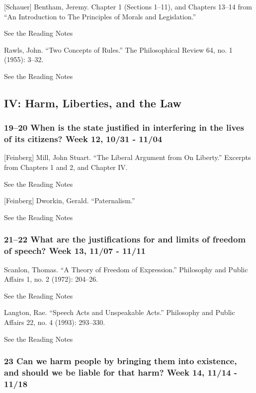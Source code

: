 \documentclass[11pt,]{article}
\begin{document}
{[}Schauer{]} Bentham, Jeremy. Chapter 1 (Sections 1--11), and Chapters
13--14 from ``An Introduction to The Principles of Morals and
Legislation.''

See the Reading Notes

Rawls, John. ``Two Concepts of Rules.'' The Philosophical Review 64, no.
1 (1955): 3--32.

See the Reading Notes

\subsection{IV: Harm, Liberties, and the
Law}\label{iv-harm-liberties-and-the-law}

\subsubsection{19--20 When is the state justified in interfering in the
lives of its citizens? Week 12, 10/31 -
11/04}\label{when-is-the-state-justified-in-interfering-in-the-lives-of-its-citizens-week-12-1031---1104}

{[}Feinberg{]} Mill, John Stuart. ``The Liberal Argument from On
Liberty.'' Excerpts from Chapters 1 and 2, and Chapter IV.

See the Reading Notes

{[}Feinberg{]} Dworkin, Gerald. ``Paternalism.''

See the Reading Notes

\subsubsection{21--22 What are the justifications for and limits of
freedom of speech? Week 13, 11/07 -
11/11}\label{what-are-the-justifications-for-and-limits-of-freedom-of-speech-week-13-1107---1111}

Scanlon, Thomas. ``A Theory of Freedom of Expression.'' Philosophy and
Public Affairs 1, no. 2 (1972): 204--26.

See the Reading Notes

Langton, Rae. ``Speech Acts and Unspeakable Acts.'' Philosophy and
Public Affairs 22, no. 4 (1993): 293--330.

See the Reading Notes

\subsubsection{23 Can we harm people by bringing them into existence,
and should we be liable for that harm? Week 14, 11/14 -
11/18}\label{can-we-harm-people-by-bringing-them-into-existence-and-should-we-be-liable-for-that-harm-week-14-1114---1118}
\end{document}
